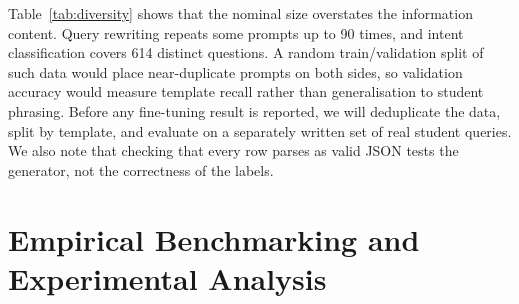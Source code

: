 \documentclass[conference]{IEEEtran}
\begin{document}
\begin{table}[t]
\caption{Diversity of the Released Dataset (Computed from the JSONL File)}
\label{tab:diversity}
\centering
{}
\end{table}

Table~\ref{tab:diversity} shows that the nominal size overstates the information content. Query rewriting repeats some prompts up to 90 times, and intent classification covers 614 distinct questions. A random train/validation split of such data would place near-duplicate prompts on both sides, so validation accuracy would measure template recall rather than generalisation to student phrasing. Before any fine-tuning result is reported, we will deduplicate the data, split by template, and evaluate on a separately written set of real student queries. We also note that checking that every row parses as valid JSON tests the generator, not the correctness of the labels.

\section{Empirical Benchmarking and Experimental Analysis}\label{sec:eval}
\end{document}
